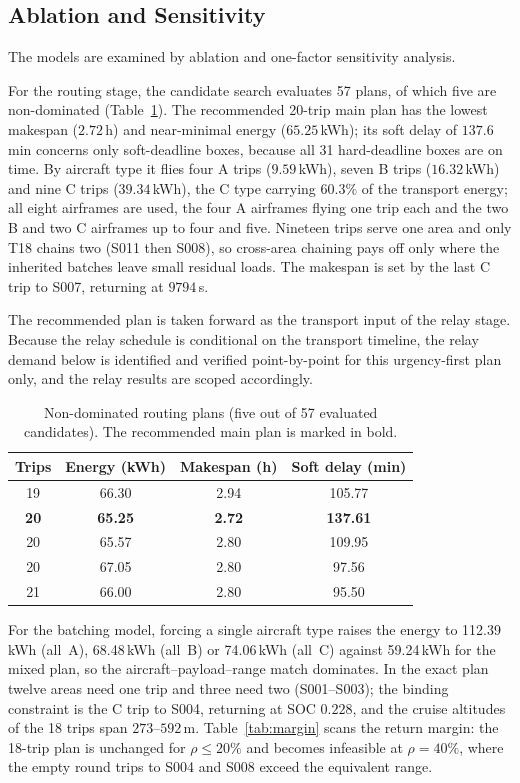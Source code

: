 \documentclass[journal]{IEEEtran}
\begin{document}
\subsection{Ablation and Sensitivity}
The models are examined by ablation and one-factor sensitivity analysis.

For the routing stage, the candidate search evaluates 57 plans, of which five
are non-dominated (Table~\ref{tab:pareto}). The recommended 20-trip main plan
has the lowest makespan ($2.72$\,h) and near-minimal energy ($65.25$\,kWh); its
soft delay of $137.6$\,min concerns only soft-deadline boxes, because all 31
hard-deadline boxes are on time. By aircraft type it flies four A trips
($9.59$\,kWh), seven B trips ($16.32$\,kWh) and nine C trips ($39.34$\,kWh), the C
type carrying $60.3\%$ of the transport energy; all eight airframes are used, the
four A airframes flying one trip each and the two B and two C airframes up to
four and five. Nineteen trips serve one area and only T18 chains two (S011 then
S008), so cross-area chaining pays off only where the inherited batches leave
small residual loads. The makespan is set by the last C trip to S007, returning
at $9794$\,s.

The recommended plan is taken forward as the transport input of the relay
stage. Because the relay schedule is conditional on the transport timeline,
the relay demand below is identified and verified point-by-point for this
urgency-first plan only, and the relay results are scoped accordingly.

\begin{table}[t]
\centering
\footnotesize
\setlength{\tabcolsep}{3pt}
\caption{Non-dominated routing plans (five out of 57 evaluated candidates).
The recommended main plan is marked in bold.}
\label{tab:pareto}
\begin{tabular}{cccc}
\toprule
Trips & Energy (kWh) & Makespan (h) & Soft delay (min) \\
\midrule
19 & 66.30 & 2.94 & 105.77 \\
\textbf{20} & \textbf{65.25} & \textbf{2.72} & \textbf{137.61} \\
20 & 65.57 & 2.80 & 109.95 \\
20 & 67.05 & 2.80 & 97.56 \\
21 & 66.00 & 2.80 & 95.50 \\
\bottomrule
\end{tabular}
\end{table}

For the batching model, forcing a single aircraft type raises the energy to
112.39\,kWh (all~A), 68.48\,kWh (all~B) or 74.06\,kWh (all~C) against
59.24\,kWh for the mixed plan, so the aircraft--payload--range match dominates.
In the exact plan twelve areas need one trip and three need two (S001--S003);
the binding constraint is the C trip to S004, returning at SOC $0.228$, and the
cruise altitudes of the 18 trips span $273$--$592$\,m. Table~\ref{tab:margin}
scans the return margin: the 18-trip plan is unchanged for $\rho\le20\%$ and
becomes infeasible at $\rho{=}40\%$, where the empty round trips to S004 and
S008 exceed the equivalent range.
\end{document}
